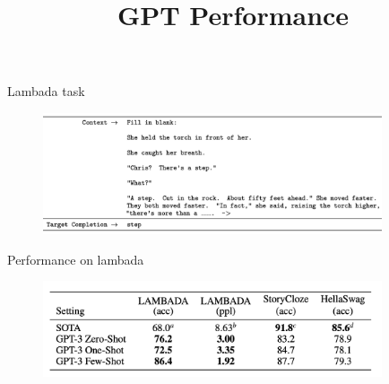 



\newcommand{\learninggoals}{
\item Recap GPT and the ideas behind standard language modelling
\item Understand the difference between fine-tuning and X-shot learning}
\def\myblue#1{\textcolor{texblue}{#1}}

\title{GPT Performance}
\date{}




\begin{vbframe}{Lambada task}

\vfill

	\begin{figure}
		\centering
		\includegraphics[width=10cm]{figure/lambadaformat.png}
	\end{figure}

\vfill

\end{vbframe}


\begin{vbframe}{Performance on lambada}

\vfill

	\begin{figure}
		\centering
		\includegraphics[width=10cm]{figure/lambadaperf.png}
	\end{figure}

\vfill

\end{vbframe}

